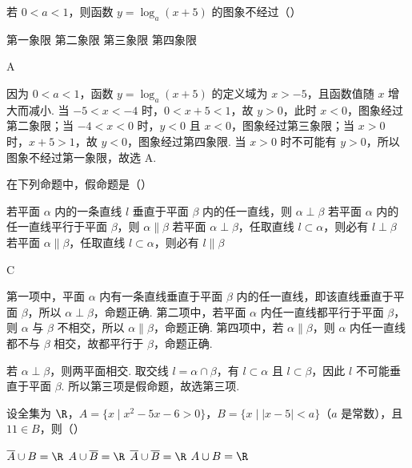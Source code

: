 \begin{problem}
若 \(0 < a < 1\)，则函数 \(y = \log_a(x + 5)\) 的图象不经过（\quad）

\choices
    {第一象限}
    {第二象限}
    {第三象限}
    {第四象限}
\end{problem}

\begin{answer}
A
\end{answer}

\begin{solution}
因为 \(0<a<1\)，函数 \(y=\log_a(x+5)\) 的定义域为 \(x>-5\)，且函数值随 \(x\) 增大而减小. 当 \(-5<x<-4\) 时，\(0<x+5<1\)，故 \(y>0\)，此时 \(x<0\)，图象经过第二象限；当 \(-4<x<0\) 时，\(y<0\) 且 \(x<0\)，图象经过第三象限；当 \(x>0\) 时，\(x+5>1\)，故 \(y<0\)，图象经过第四象限. 当 \(x>0\) 时不可能有 \(y>0\)，所以图象不经过第一象限，故选 A.
\end{solution}

\begin{problem}
在下列命题中，假命题是（\quad）

\choices
    {若平面 \(\alpha \) 内的一条直线 \(l\) 垂直于平面 \(\beta \) 内的任一直线，则 \(\alpha \perp \beta \)}
    {若平面 \(\alpha \) 内的任一直线平行于平面 \(\beta \)，则 \(\alpha \parallel \beta \)}
    {若平面 \(\alpha \perp \beta \)，任取直线 \(l \subset \alpha \)，则必有 \(l \perp \beta \)}
    {若平面 \(\alpha \parallel \beta\)，任取直线 \(l \subset \alpha\)，则必有 \(l \parallel \beta\)}
\end{problem}

\begin{answer}
C
\end{answer}

\begin{solution}
第一项中，平面 \(\alpha\) 内有一条直线垂直于平面 \(\beta\) 内的任一直线，即该直线垂直于平面 \(\beta\)，所以 \(\alpha\perp\beta\)，命题正确. 第二项中，若平面 \(\alpha\) 内任一直线都平行于平面 \(\beta\)，则 \(\alpha\) 与 \(\beta\) 不相交，所以 \(\alpha\parallel\beta\)，命题正确. 第四项中，若 \(\alpha\parallel\beta\)，则 \(\alpha\) 内任一直线都不与 \(\beta\) 相交，故都平行于 \(\beta\)，命题正确.

若 \(\alpha\perp\beta\)，则两平面相交. 取交线 \(l=\alpha\cap\beta\)，有 \(l\subset\alpha\) 且 \(l\subset\beta\)，因此 \(l\) 不可能垂直于平面 \(\beta\). 所以第三项是假命题，故选第三项.
\end{solution}

\begin{problem}
设全集为 \(\R\)，\(A=\{x\mid x^{2}-5x-6>0\}\)，\(B=\{x\mid \lvert x-5\rvert<a\}\)（\(a\) 是常数），且 \(11\in B\)，则（\quad）

\choices
    {\(\overline{A} \cup B = \R\)}
    {\(A \cup \overline{B} = \R\)}
    {\(\overline{A} \cup \overline{B} = \R\)}
    {\(A \cup B = \R\)}
\end{problem}


